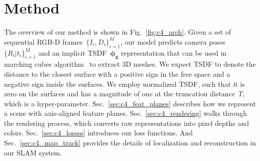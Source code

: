 \section{Method}
The overview of our method is shown in Fig.~\ref{fig:c4_arch}. Given a set of sequential RGB-D frames~$\{I_{i}, D_{i}\}_{i=1}^M$, our model predicts camera poses~$\{R_{i}| t_{i}\}_{i=1}^M$ and an implicit TSDF~$\boldsymbol{\phi_{g}}$ representation that can be used in marching cubes algorithm~\cite{lorensen1987marching} to extract 3D meshes. We expect TSDF to denote the distance to the closest surface with a positive sign in the free space and a negative sign inside the surfaces. We employ normalized TSDF, such that it is zero on the surfaces and has a magnitude of one at the truncation distance~$T$, which is a hyper-parameter. Sec.~\ref{sec:c4_feat_planes} describes how we represent a scene with axis-aligned feature planes. Sec.~\ref{sec:c4_rendering} walks through the rendering process, which converts raw representations into pixel depths and colors. Sec.~\ref{sec:c4_losses} introduces our loss functions. And Sec.~\ref{sec:c4_map_track} provides the details of localization and reconstruction in our SLAM system.

